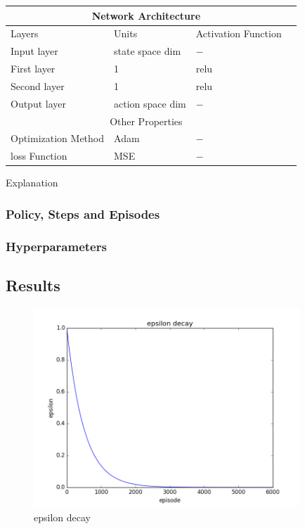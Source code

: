 \documentclass[12pt]{article}
\begin{document}
\begin{table}[h]
  \centering
\begin{tabular}{ |p{3cm}||p{3cm}|p{3cm}|p{3cm}|  }
 \hline
 \multicolumn{3}{|c|}{Network Architecture} \\
 \hline
 Layers     & Units & Activation Function \\
 \hline
 Input layer  & state space dim & $-$ \\
 First layer  & 1 & relu \\
 Second layer & 1 & relu \\
 Output layer & action space dim & $-$ \\
 \hline
 \multicolumn{3}{|c|}{Other Properties} \\
 \hline
 Optimization Method &Adam & $-$ \\
 \hline
 loss Function &MSE &$-$ \\
 \hline
\end{tabular}
\end{table}

Explanation

\subsubsection{Policy, Steps and Episodes}
\subsubsection{Hyperparameters}
\subsection{Results}
\begin{figure}[h]
    \centering
    \includegraphics[width=10cm]{epsilon_decay}
    \caption{epsilon decay}
    \label{fig:3D environment created in matplotlib}
\end{figure}
\end{document}

